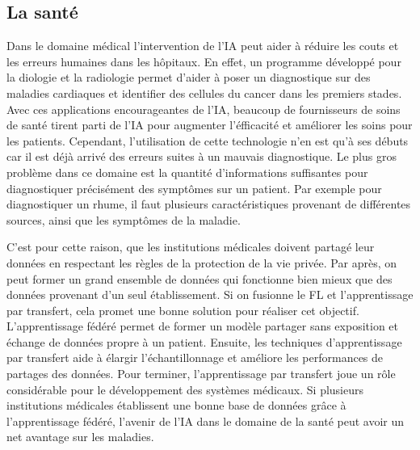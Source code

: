 \documentclass[12pt,a4paper]{report}
\begin{document}
\subsection{La santé}

Dans le domaine médical l'intervention de l'IA peut aider à réduire les couts et les erreurs humaines dans les hôpitaux. En effet, un programme développé pour la diologie et la radiologie permet d'aider à poser un diagnostique sur des maladies cardiaques et identifier des cellules du cancer dans les premiers stades. Avec ces applications encourageantes de l'IA, beaucoup de fournisseurs de soins de santé tirent parti de l'IA pour augmenter l'éfficacité et améliorer les soins pour les patients. Cependant, l'utilisation de cette technologie n'en est qu'à ses débuts car il est déjà arrivé des erreurs suites à un mauvais diagnostique. Le plus gros problème dans ce domaine est la quantité d'informations suffisantes pour diagnostiquer précisément des symptômes sur un patient. Par exemple pour diagnostiquer un rhume, il faut plusieurs caractéristiques provenant de différentes sources, ainsi que les symptômes de la maladie.

C'est pour cette raison, que les institutions médicales doivent partagé leur données en respectant les règles de la protection de la vie privée. Par après, on peut former un grand ensemble de données qui fonctionne bien mieux que des données provenant d'un seul établissement. Si on fusionne le FL et l'apprentissage par transfert, cela promet une bonne solution pour réaliser cet objectif. L'apprentissage fédéré permet de former un modèle partager sans exposition et échange de données propre à un patient. Ensuite, les techniques d'apprentissage par transfert aide à élargir l'échantillonnage et améliore les performances de partages des données. Pour terminer, l'apprentissage par transfert joue un rôle considérable pour le développement des systèmes médicaux. Si plusieurs institutions médicales établissent une bonne base de données grâce à l'apprentissage fédéré, l'avenir de l'IA dans le domaine de la santé peut avoir un net avantage sur les maladies. 
\end{document}
